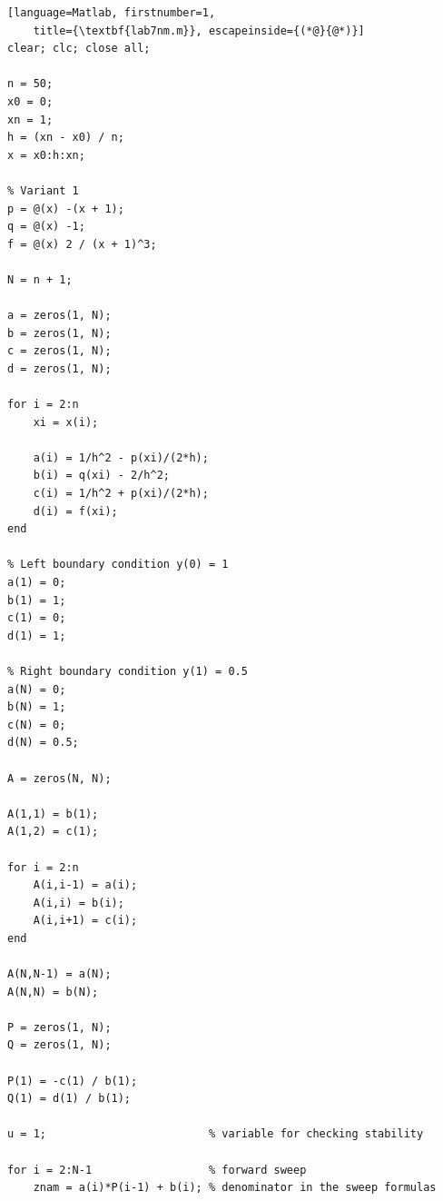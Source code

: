 \documentclass[12pt,a4paper]{article}
\begin{document}
\begin{lstlisting}[language=Matlab, firstnumber=1, 
	title={\textbf{lab7nm.m}}, escapeinside={(*@}{@*)}]
clear; clc; close all;                    

n = 50;                                    
x0 = 0;                                    
xn = 1;                                    
h = (xn - x0) / n;                         
x = x0:h:xn;                               

% Variant 1
p = @(x) -(x + 1);                     
q = @(x) -1;                  
f = @(x) 2 / (x + 1)^3;                       

N = n + 1;                              

a = zeros(1, N);                           
b = zeros(1, N);                           
c = zeros(1, N);                           
d = zeros(1, N);                           

for i = 2:n                                
    xi = x(i);                             

    a(i) = 1/h^2 - p(xi)/(2*h);            
    b(i) = q(xi) - 2/h^2;                  
    c(i) = 1/h^2 + p(xi)/(2*h);            
    d(i) = f(xi);                          
end                            

% Left boundary condition y(0) = 1
a(1) = 0;
b(1) = 1;
c(1) = 0;
d(1) = 1;

% Right boundary condition y(1) = 0.5
a(N) = 0;
b(N) = 1;
c(N) = 0;
d(N) = 0.5;                              

A = zeros(N, N);    

A(1,1) = b(1);                             
A(1,2) = c(1);                             

for i = 2:n                                
    A(i,i-1) = a(i);                       
    A(i,i) = b(i);                         
    A(i,i+1) = c(i);                       
end

A(N,N-1) = a(N);                           
A(N,N) = b(N);                             

P = zeros(1, N);       
Q = zeros(1, N);       

P(1) = -c(1) / b(1);                    
Q(1) = d(1) / b(1);                     

u = 1;                         % variable for checking stability

for i = 2:N-1                  % forward sweep
    znam = a(i)*P(i-1) + b(i); % denominator in the sweep formulas


\end{lstlisting}
\end{document}
